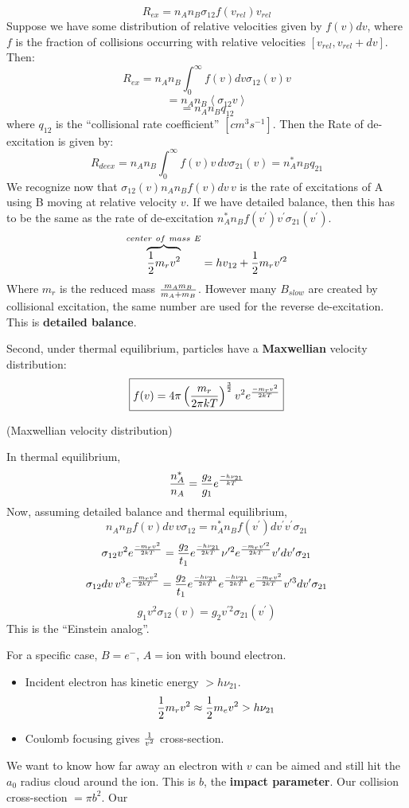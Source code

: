 \documentclass[11pt]{article}
\def\hf{{1 \over 2}}
\def\inv#1{{1 \over #1}}
\def\mean#1{\left\langle #1\right\rangle}
\def\sigot{\sigma_{12}}
\def\sigto{\sigma_{21}}
\begin{document}
\def\rex{R_{ex}}
\def\vrel{v_{rel}}
$$\rex = n_An_B\sigma_{12}f(\vrel)\vrel$$
Suppose we have some distribution of relative velocities given by $f(v)dv$,
where $f$ is the fraction of collisions occurring with relative velocities
$[\vrel, \vrel +dv]$.  Then:
$$\rex = n_An_B\int_0^{\infty}f(v)dv\sigot(v)v$$
$$=n_An_B \mean{\sigot v}$$
\def\qot{q_{12}}
\def\qto{q_{21}}
$$=n_An_B\qot$$
where $\qot$ is the ``collisional rate coefficient'' $[cm^3s^{-1}]$.  Then the
Rate of de-excitation is given by:
$$R_{deex} = n_An_B\int_0^\infty{f(v)v\,dv\sigma_{21}(v) = n_A^*n_B\qto}$$
We recognize now that $\sigot(v)n_An_Bf(v)dv\,v$ is the rate of excitations of 
A using B moving at relative velocity $v$.  If we have detailed balance,
then this has to be the same as the rate of de-excitation
$n_A^*n_Bf(v^\prime)v^\prime\sigto(v^\prime)$.
$$\overbrace{\hf m_rv^2}^{center\ of\ mass\ E} = hv_{12} + \hf m_rv^{\prime2}$$
Where $m_r$ is the reduced mass $m_Am_B\over m_A+m_B$. However many $B_{slow}$
are created by collisional excitation, the same number are used for the
reverse de-excitation.  This is {\bf detailed balance}.\par
Second, under thermal equilibrium, particles have a {\bf Maxwellian} velocity
distribution:
$$\boxed{f(v)=4\pi\left({m_r\over 2\pi kT}\right)^{3\over 2}v^2
e^{-m_rv^2\over 2kT}}$$
\centerline{(Maxwellian velocity distribution)}
In thermal equilibrium,
$${n_A^*\over n_A} = {g_2\over g_1}e^{-h\nu_{21}\over kT}$$
Now, assuming detailed balance and thermal equilibrium,
$$n_An_Bf(v)dv\,v\sigot=n_A^*n_Bf(v^\prime)dv^\prime v^\prime \sigto$$
\def\emvkt{e^{-m_rv^2\over2kT}}
\def\emvpkt{e^{-m_rv^{\prime2}\over2kT}}
\def\ehvkt{e^{-h\nu_{21}\over2kT}}
$$\sigot v^2\emvkt = {g_2\over t_1}\ehvkt \nu^{\prime2}\emvpkt v^\prime 
dv^\prime\sigto$$
$$\sigot dv\,v^3 \emvkt = {g_2\over t_1}\ehvkt \ehvkt \emvkt v^{\prime3}
dv^\prime \sigto$$
$$\boxed{g_1v^2\sigot(v) = g_2v^{\prime2}\sigto(v^\prime)}$$
This is the ``Einstein analog''.\par
For a specific case, $B=e^-$, $A=$ion with bound electron.
\begin{itemize}
\item Incident electron has kinetic energy $>h\nu_{21}$.
$$\hf m_rv^2 \approx \hf m_ev^2 > h\nu_{21}$$
\item  Coulomb focusing gives $\inv{v^2}$ cross-section.
\end{itemize}
We want to know how far away an electron with $v$ can be aimed
and still hit the $a_0$ radius cloud around the ion.  This is $b$, the
{\bf impact parameter}.  Our collision cross-section $=\pi b^2$.  Our
\end{document}

